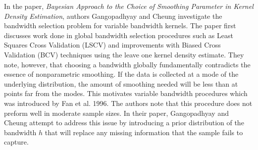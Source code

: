 \documentclass[12pt]{article}  %
\begin{document}
In the paper, \textit{Bayesian Approach to the Choice of Smoothing Parameter in Kernel Density Estimation}, authors Gangopadhyay and Cheung investigate the bandwidth selection problem for variable bandwidth kernels. The paper first discusses work done in global bandwidth selection procedures such as Least Squares Cross Validation (LSCV) and improvements with Biased Cross Validation (BCV) techniques using the leave one kernel density estimate. They note, however, that choosing a bandwidth globally fundamentally contradicts the essence of nonparametric smoothing. If the data is collected at a mode of the underlying distribution, the amount of smoothing needed will be less than at points far from the modes. This motivates variable bandwidth procedures which was introduced by Fan et al. 1996. The authors note that this procedure does not preform well in moderate sample sizes. In their paper, Gangopadhyay and Cheung attempt to address this issue by introducing a prior distribution of the bandwidth $h$ that will replace any missing information that the sample fails to capture. 
\end{document}
